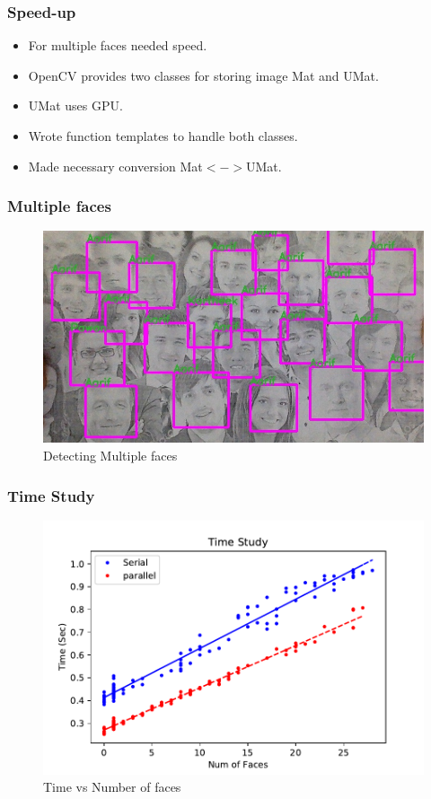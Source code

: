 \documentclass[aspectratio=149]{beamer}
\begin{document}

\begin{frame}
\frametitle{Speed-up}
\begin{itemize}
	\item For multiple faces needed speed.
	\item OpenCV provides two classes for storing image Mat and UMat.
	\item UMat uses GPU.
	\item Wrote function templates to handle both classes.
	\item Made necessary conversion Mat$<->$UMat.
\end{itemize}
\end{frame}


\begin{frame}
\frametitle{Multiple faces}
\begin{figure}
	\centering
	\includegraphics[scale=0.4]{./images/mul.jpg}
	\caption{Detecting Multiple faces}
\end{figure}
\end{frame}


\begin{frame}
\frametitle{Time Study}
\begin{figure}
	\centering
	\includegraphics[scale=0.65]{./images/plot.pdf}
	\caption{Time vs Number of faces}
\end{figure}
\end{frame}
\end{document}
